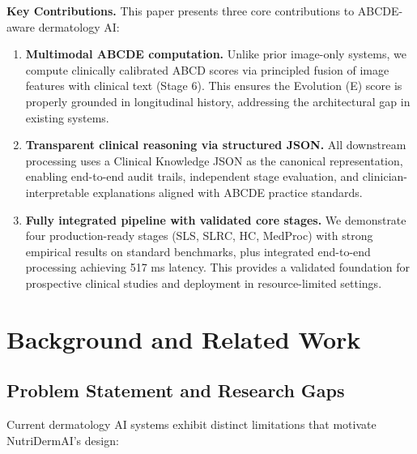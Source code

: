 \documentclass[conference]{IEEEtran}
\begin{document}
\textbf{Key Contributions.} This paper presents three core contributions to
ABCDE-aware dermatology AI:

\begin{enumerate}[leftmargin=*]
    \item \textbf{Multimodal ABCDE computation.} Unlike prior image-only
          systems, we compute clinically calibrated ABCD scores via principled
          fusion of image features with clinical text (Stage 6). This ensures
          the Evolution (E) score is properly grounded in longitudinal history,
          addressing the architectural gap in existing systems.
    \item \textbf{Transparent clinical reasoning via structured JSON.} All
          downstream processing uses a Clinical Knowledge JSON as the canonical
          representation, enabling end-to-end audit trails, independent stage
          evaluation, and clinician-interpretable explanations aligned with
          ABCDE practice standards.
    \item \textbf{Fully integrated pipeline with validated core stages.} We
          demonstrate four production-ready stages (SLS, SLRC, HC, MedProc)
          with strong empirical results on standard benchmarks, plus integrated
          end-to-end processing achieving 517 ms latency. This provides a
          validated foundation for prospective clinical studies and deployment
          in resource-limited settings.
\end{enumerate}

\section{Background and Related Work}

\subsection{Problem Statement and Research Gaps}

Current dermatology AI systems exhibit distinct limitations that motivate
NutriDermAI's design:
\end{document}
